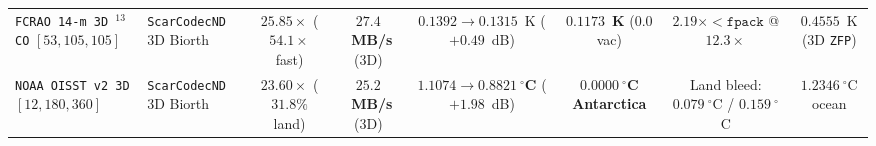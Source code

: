 \documentclass[10pt,twocolumn]{article}
\begin{document}
\begin{table}[t]
{\begin{tabular}{llcccccc}
\texttt{FCRAO 14-m 3D $^{13}$CO} $[53,105,105]$ & \texttt{ScarCodecND} 3D Biorth & $\mathbf{25.85\times}$ ($\mathbf{54.1\times}$ fast) & $\mathbf{27.4}$~\textbf{MB/s} (3D) & $0.1392 \to \mathbf{0.1315}$~K ($+0.49$~dB) & $\mathbf{0.1173}$~\textbf{K} ($\mathbf{0.0}$ vac) & $2.19\times < \texttt{fpack}$ @ $12.3\times$ & $0.4555$~K (3D \texttt{ZFP}) \\
\texttt{NOAA OISST v2 3D} $[12,180,360]$ & \texttt{ScarCodecND} 3D Biorth & $\mathbf{23.60\times}$ ($31.8\%$ land) & $\mathbf{25.2}$~\textbf{MB/s} (3D) & $1.1074 \to \mathbf{0.8821~^\circ\textbf{C}}$ ($+1.98$~dB) & $\mathbf{0.0000~^\circ\textbf{C}}$ \textbf{Antarctica} & Land bleed: $0.079~^\circ$C / $0.159~^\circ$C & $1.2346~^\circ$C ocean \\
\bottomrule
\end{tabular}%
}
\end{table}
\end{document}
